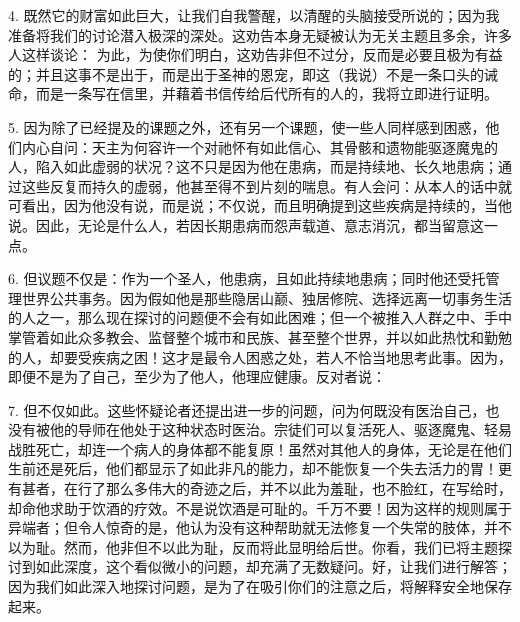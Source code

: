 4. 既然它的财富如此巨大，让我们自我警醒，以清醒的头脑接受所说的；因为我准备将我们的讨论潜入极深的深处。这劝告本身无疑被认为无关主题且多余，许多人这样谈论： 为此，为使你们明白，这劝告非但不过分，反而是必要且极为有益的；并且这事不是出于，而是出于圣神的恩宠，即这（我说）不是一条口头的诫命，而是一条写在信里，并藉着书信传给后代所有的人的，我将立即进行证明。\par

5. 因为除了已经提及的课题之外，还有另一个课题，使一些人同样感到困惑，他们内心自问：天主为何容许一个对祂怀有如此信心、其骨骸和遗物能驱逐魔鬼的人，陷入如此虚弱的状况？这不只是因为他在患病，而是持续地、长久地患病；通过这些反复而持久的虚弱，他甚至得不到片刻的喘息。有人会问：从本人的话中就可看出，因为他没有说，而是说；不仅说，而且明确提到这些疾病是持续的，当他说。因此，无论是什么人，若因长期患病而怨声载道、意志消沉，都当留意这一点。\par

6. 但议题不仅是：作为一个圣人，他患病，且如此持续地患病；同时他还受托管理世界公共事务。因为假如他是那些隐居山巅、独居修院、选择远离一切事务生活的人之一，那么现在探讨的问题便不会有如此困难；但一个被推入人群之中、手中掌管着如此众多教会、监督整个城市和民族、甚至整个世界，并以如此热忱和勤勉的人，却要受疾病之困！这才是最令人困惑之处，若人不恰当地思考此事。因为，即便不是为了自己，至少为了他人，他理应健康。反对者说：\par

7. 但不仅如此。这些怀疑论者还提出进一步的问题，问为何既没有医治自己，也没有被他的导师在他处于这种状态时医治。宗徒们可以复活死人、驱逐魔鬼、轻易战胜死亡，却连一个病人的身体都不能复原！虽然对其他人的身体，无论是在他们生前还是死后，他们都显示了如此非凡的能力，却不能恢复一个失去活力的胃！更有甚者，在行了那么多伟大的奇迹之后，并不以此为羞耻，也不脸红，在写给时，却命他求助于饮酒的疗效。不是说饮酒是可耻的。千万不要！因为这样的规则属于异端者；但令人惊奇的是，他认为没有这种帮助就无法修复一个失常的肢体，并不以为耻。然而，他非但不以此为耻，反而将此显明给后世。你看，我们已将主题探讨到如此深度，这个看似微小的问题，却充满了无数疑问。好，让我们进行解答；因为我们如此深入地探讨问题，是为了在吸引你们的注意之后，将解释安全地保存起来。\par

